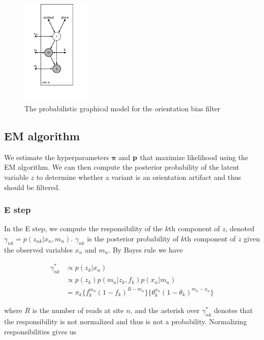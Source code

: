 \documentclass[a4paper]{article}
\newcommand{\vp}{{\bf p}}
\newcommand{\vpi}{{\bm \pi}}
\begin{document}
\begin{figure}
\centering
\includegraphics[width=0.3\textwidth]{pgm.png}
\caption{\label{fig:pgm} The probabilistic graphical model for the orientation bias filter}
\end{figure}


\subsection{EM algorithm}
We estimate the hyperparameters $\vpi$ and $\vp$ that maximize likelihood using the EM algorithm. We can then compute the posterior probability of the latent variable $z$ to determine whether a variant is an orientation artifact and thus should be filtered.

\subsubsection{E step}
In the E step, we compute the responsibility of the $k$th component of $z$, denoted $\gamma_{nk} = p(z_{nk} | x_n, m_n)$. $\gamma_{nk}$ is the posterior probability of $k$th component of $z$ given the observed variables $x_n$ and $m_n$. By Bayes rule we have

\begin{align}
\gamma^*_{nk} &\propto p(z_{k} | x_n) \nonumber \\
		        &\propto p(z_{k}) p(m_n | z_k, f_{k} ) p(x_n | m_n ) \nonumber \\
		        &= \pi_k  \{ f_{k}^{m_n} (1-f_k)^{R - m_n} \} \{ \theta_k^{x_n} (1 - \theta_k)^{m_n - x_n} \}
\end{align}

where $R$ is the number of reads at site $n$, and the asterisk over $\gamma^*_{nk}$ denotes that the responsibility is not normalized and thus is not a probability. Normalizing responsibilities gives us
\end{document}
